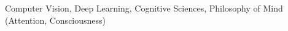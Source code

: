 

\vspace{2mm}


Computer Vision, Deep Learning, Cognitive Sciences,
Philosophy of Mind (Attention, Consciousness)

